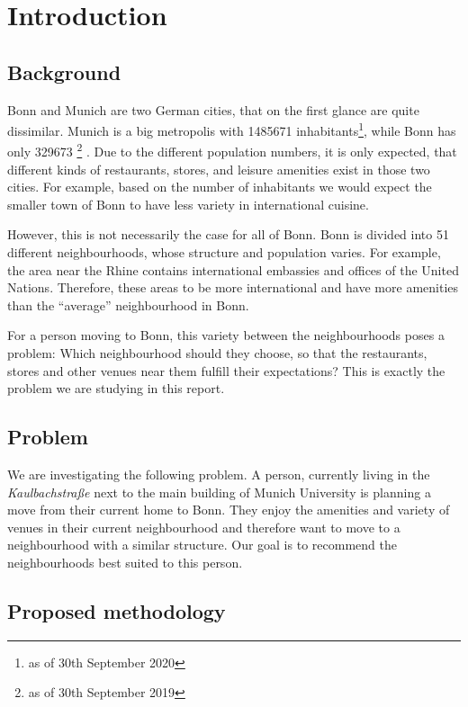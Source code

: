 \documentclass[UKenglish]{scrreprt}
\begin{document}
\chapter{Introduction}
\section{Background}
Bonn and Munich are two German cities, that on the first glance are quite dissimilar. Munich is a big metropolis with \num{1485671} inhabitants\footnote{as of 30th September 2020 }\cite{muenchen}, while Bonn has only \num{329673} \footnote{as of 30th September 2019}
\cite{bonn}. Due to the different population numbers, it is only expected, that different kinds of restaurants, stores, and leisure amenities exist in those two cities. For example, based on the number of inhabitants we would expect the smaller town of Bonn to have less variety in international cuisine. 

However, this is not necessarily the case for all of Bonn. Bonn is divided into 51 different neighbourhoods, whose structure and population varies. For example, the area near the Rhine contains international embassies and offices of the United Nations. Therefore, these areas to be more international and have more amenities than the \enquote{average} neighbourhood in Bonn.

For a person moving to Bonn, this variety between the neighbourhoods poses a problem: Which neighbourhood should they choose, so that the restaurants, stores and other venues near them fulfill their expectations? This is exactly the problem we are studying in this report.

\section{Problem}
We are investigating the following problem. A person, currently living in the \emph{Kaulbachstraße} next to the main building of Munich University is planning a move from their current home to Bonn. They enjoy the amenities and variety of venues in their current neighbourhood and therefore want to move to a neighbourhood with a similar structure. Our goal is to recommend the neighbourhoods best suited to this person. 

\section{Proposed methodology}%
\end{document}

